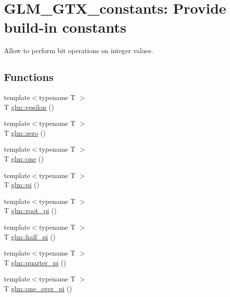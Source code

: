 \hypertarget{group__gtx__constants}{\section{\-G\-L\-M\-\_\-\-G\-T\-X\-\_\-constants\-: \-Provide build-\/in constants}
\label{group__gtx__constants}
}


\-Allow to perform bit operations on integer values.  


\subsection*{\-Functions}
\begin{DoxyCompactItemize}
\item 
{\footnotesize template$<$typename T $>$ }\\\-T \hyperlink{group__gtx__constants_ga0cc442b97435011f216fbb821327793c}{glm\-::epsilon} ()
\item 
{\footnotesize template$<$typename T $>$ }\\\-T \hyperlink{group__gtx__constants_ga67bcfc365971201378f42abb5d7d4672}{glm\-::zero} ()
\item 
{\footnotesize template$<$typename T $>$ }\\\-T \hyperlink{group__gtx__constants_ga9bb2a70c99cb2cc235ccab069a3ca786}{glm\-::one} ()
\item 
{\footnotesize template$<$typename T $>$ }\\\-T \hyperlink{group__gtx__constants_ga69e05a9d6d057c9b85abb28e8918781b}{glm\-::pi} ()
\item 
{\footnotesize template$<$typename T $>$ }\\\-T \hyperlink{group__gtx__constants_ga3fdc81f0f819e97cf045cf1c744d589a}{glm\-::root\-\_\-pi} ()
\item 
{\footnotesize template$<$typename T $>$ }\\\-T \hyperlink{group__gtx__constants_ga07bb93188460e7c43caa63a46f195a56}{glm\-::half\-\_\-pi} ()
\item 
{\footnotesize template$<$typename T $>$ }\\\-T \hyperlink{group__gtx__constants_ga2a1377434bd06788885eac5d61043963}{glm\-::quarter\-\_\-pi} ()
\item 
{\footnotesize template$<$typename T $>$ }\\\-T \hyperlink{group__gtx__constants_ga930ab5f2390cdad192ad92da2968ab37}{glm\-::one\-\_\-over\-\_\-pi} ()

\end{DoxyCompactItemize}
